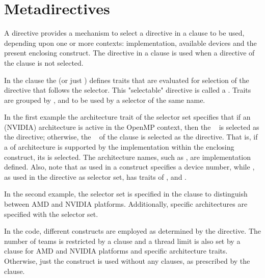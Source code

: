 \pagebreak
\section{Metadirectives}
\label{sec:metadirective}

A  directive provides a mechanism to select a directive in
a  clause to be used, depending upon one or more contexts:  
implementation, available devices and the present enclosing construct. 
The directive in a  clause is used when a directive of the 
 clause is not selected.

In the  clause the  (or just ) defines traits that are
evaluated for selection of the directive that follows the selector. 
This "selectable" directive is called a .
Traits are grouped by ,  and 
  to be used by a selector of the same name.

In the first example the architecture trait  of the 
 selector set specifies that if an  (NVIDIA) architecture is
active in the OpenMP context, then the ~ 
 is selected as the directive; otherwise, the ~
 of the  clause is selected as the directive.
That is, if a  of  architecture is supported by the implementation within
the enclosing  construct, its  is selected.
The architecture names, such as , are implementation defined.
Also, note that  as used in a  construct specifies
a device number, while , as used in the 
directive as selector set, has traits of ,  and .





In the second example, the  selector set is specified
in the  clause to distinguish between AMD and NVIDIA platforms. 
Additionally, specific architectures are specified with the  
selector set.

In the code, different  constructs are employed as determined
by the  directive.
The number of teams is restricted by a  clause
and a thread limit is also set by a  clause for 
 AMD and NVIDIA platforms and specific architecture
traits.  Otherwise, just the  construct is used without
any clauses, as prescribed by the  clause.


